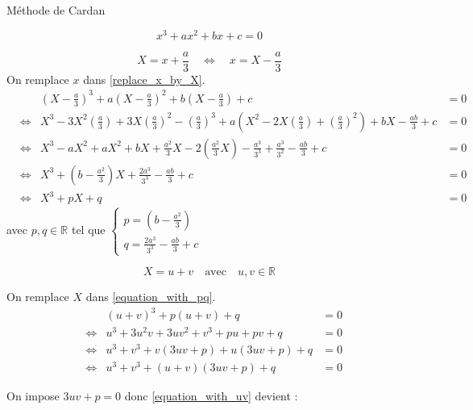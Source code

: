 \documentclass[]{../templates/homework}
\newcommand{\poly}[4]{\ensuremath{#1x^3 + #2x^2 + #3x + #4}}
\newcommand{\dppoly}[2]{\ensuremath{#1^3 + 3#1^2#2 + 3#1#2^2 + #2^3}}
\newcommand{\dmpoly}[2]{\ensuremath{#1^3 - 3#1^2#2 + 3#1#2^2 - #2^3}}
\newcommand{\dmpolytwo}[2]{\ensuremath{#1^2 - 2#1#2 + #2^2}}
\begin{document}
	
 {Méthode de Cardan}

\begin{equation}
	\tag{$E_0$}
	\poly{}{a}{b}{c} = 0
	\label{replace_x_by_X}
\end{equation}

\subproblem

\begin{equation*}
	X = x + \frac{a}{3} \quad \Leftrightarrow \quad x = X - \frac{a}{3}
\end{equation*}
On remplace $x$ dans \eqref{replace_x_by_X}.
\begin{align*}
	&& (X-\frac{a}{3})^3 + a(X-\frac{a}{3})^2 + b(X-\frac{a}{3}) + c &= 0 \\
	&\Leftrightarrow &\dmpoly{X}{(\frac{a}{3})} + a(\dmpolytwo{X}{(\frac{a}{3})}) + bX - \frac{ab}{3} + c &= 0 \\
	&\Leftrightarrow &X^3 - aX^2 + aX^2 + bX +\frac{a^2}{3}X - 2(\frac{a^2}{3}X) - \frac{a^3}{3^3} + \frac{a^3}{3^2} - \frac{ab}{3} + c &= 0 \\
	&\Leftrightarrow &X^3 + (b - \frac{a^2}{3})X + \frac{2a^3}{3^3} - \frac{ab}{3} + c &= 0 \\
	&\Leftrightarrow &X^3 + pX + q &= 0 \tag{$E_1$} \label{equation_with_pq}
\end{align*}
avec $p, q \in \mathbb{R}$ tel que
$\left\{
	\begin{array}{ll}
		p = (b - \frac{a^2}{3})\\
		q = \frac{2a^3}{3^3} - \frac{ab}{3} + c
	\end{array}
\right.$

\subproblem
\question

\begin{equation*}
	X = u + v \quad \text{avec} \quad u, v \in \mathbb{R}
\end{equation*}

On remplace $X$ dans \eqref{equation_with_pq}.
\begin{align*}
	&& (u + v)^3 + p(u + v) + q &= 0 \\
	&\Leftrightarrow &\dppoly{u}{v} + pu + pv + q &= 0 \\
	&\Leftrightarrow &u^3 + v^3 + v(3uv + p) + u(3uv + p) + q &= 0 \\
	&\Leftrightarrow &u^3 + v^3 + (u + v)(3uv + p) + q &= 0 \tag{$E_2$} \label{equation_with_uv}
\end{align*}

\question

On impose $3uv + p = 0$ donc \eqref{equation_with_uv} devient :
\end{document}
